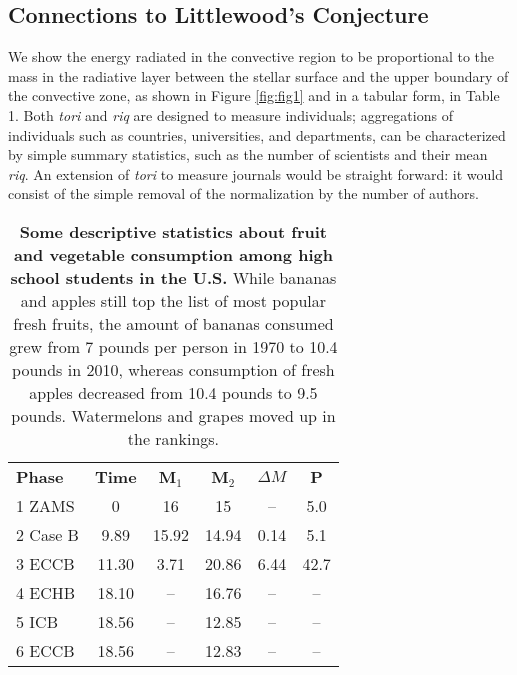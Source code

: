 \subsection{Connections to Littlewood's Conjecture}

We show the energy radiated in the convective region to be propo\cite{Aston_Polz_2000}rtional to the mass in the radiative layer between the stellar surface and the upper boundary of the convective zone, as shown in Figure \ref{fig:fig1} and in a tabular form, in Table 1. Both {\it tori} and {\it riq} are designed \cite{riel_Polz_Moosbauer_Necek_2000}to measure individuals; aggregations of individuals such as countries, universities, and departments, can be characterized by simple summary statistics, such as the number of scientists and their mean {\it riq}. An extension of {\it tori} to measure journals would be straight forward: it would consist of the simple removal of the normalization by the number of authors.  

\begin{table}
\begin{tabular}{lccccc}
\hline
\textbf{Phase}        & \textbf{Time} & \textbf{M$_1$}  & \textbf{M$_2$} &  \textbf{$\Delta M$} & \textbf{P} \\   
1 ZAMS           & 0      & 16     & 15    & --   & 5.0   \\            
2 Case B       & 9.89   & 15.92  & 14.94 & 0.14 & 5.1   \\
3 ECCB        & 11.30  &  3.71  & 20.86 & 6.44 & 42.7  \\
4 ECHB      & 18.10  & --     & 16.76 &  --  & --    \\
5 ICB       & 18.56  & --     & 12.85 &  --  & --    \\    
6 ECCB      & 18.56  & --     & 12.83 &  --  & --    \\
\hline
\end{tabular}
\caption{\textbf{Some descriptive statistics about fruit and vegetable consumption among high school students in the U.S.} While bananas and apples still top the list of most popular fresh fruits, the amount of bananas consumed grew from 7 pounds per person in 1970 to 10.4 pounds in 2010, whereas consumption of fresh apples decreased from 10.4 pounds to 9.5 pounds. Watermelons and grapes moved up in the rankings.}
\end{table}
